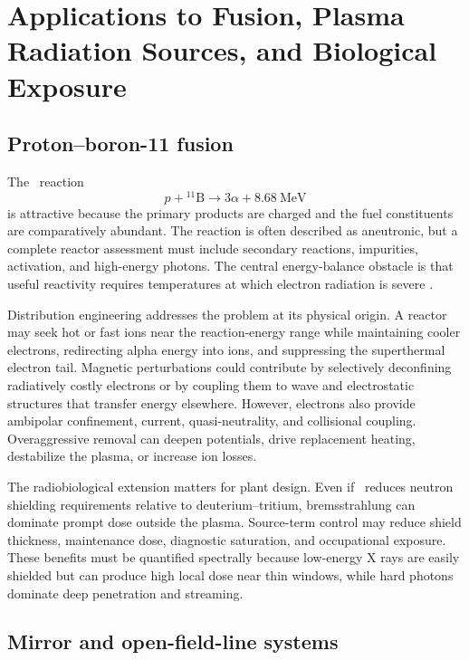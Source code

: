 \chapter{Applications to Fusion, Plasma Radiation Sources, and Biological Exposure}
\label{ch:applications}

\section{Proton--boron-11 fusion}

The \pB \ reaction
\begin{equation}
p+{}^{11}\mathrm{B}\rightarrow 3\alpha+8.68\ \mathrm{MeV}
\end{equation}
is attractive because the primary products are charged and the fuel constituents are comparatively abundant. The reaction is often described as aneutronic, but a complete reactor assessment must include secondary reactions, impurities, activation, and high-energy photons. The central energy-balance obstacle is that useful reactivity requires temperatures at which electron radiation is severe \cite{rider1995,nevins2000,sikora2016,ochs2022}.

Distribution engineering addresses the problem at its physical origin. A reactor may seek hot or fast ions near the reaction-energy range while maintaining cooler electrons, redirecting alpha energy into ions, and suppressing the superthermal electron tail. Magnetic perturbations could contribute by selectively deconfining radiatively costly electrons or by coupling them to wave and electrostatic structures that transfer energy elsewhere. However, electrons also provide ambipolar confinement, current, quasi-neutrality, and collisional coupling. Overaggressive removal can deepen potentials, drive replacement heating, destabilize the plasma, or increase ion losses.

The radiobiological extension matters for plant design. Even if \pB \ reduces neutron shielding requirements relative to deuterium--tritium, bremsstrahlung can dominate prompt dose outside the plasma. Source-term control may reduce shield thickness, maintenance dose, diagnostic saturation, and occupational exposure. These benefits must be quantified spectrally because low-energy X rays are easily shielded but can produce high local dose near thin windows, while hard photons dominate deep penetration and streaming.

\section{Mirror and open-field-line systems}

